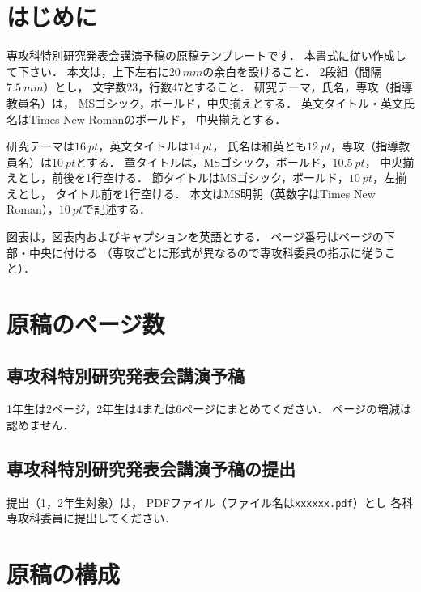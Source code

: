 \documentclass[nogutter]{ac-resume}
\begin{document}
\maketitle

\section{はじめに}

専攻科特別研究発表会講演予稿の原稿テンプレートです．
本書式に従い作成して下さい．
本文は，上下左右に$\SI{20}{mm}$の余白を設けること．
2段組（間隔$\SI{7.5}{mm}$）とし，
文字数23，行数47とすること．
研究テーマ，氏名，専攻（指導教員名）は，
MSゴシック，ボールド，中央揃えとする．
英文タイトル・英文氏名はTimes New Romanのボールド，
中央揃えとする．

研究テーマは$\SI{16}{pt}$，英文タイトルは$\SI{14}{pt}$，
氏名は和英とも$\SI{12}{pt}$，専攻（指導教員名）は$\SI{10}{pt}$とする．
章タイトルは，MSゴシック，ボールド，$\SI{10.5}{pt}$，
中央揃えとし，前後を1行空ける．
節タイトルはMSゴシック，ボールド，$\SI{10}{pt}$，左揃えとし，
タイトル前を1行空ける．
本文はMS明朝（英数字はTimes New Roman），$\SI{10}{pt}$で記述する．

図表は，図表内およびキャプションを英語とする．
ページ番号はページの下部・中央に付ける
（専攻ごとに形式が異なるので専攻科委員の指示に従うこと）．

\section{原稿のページ数}

\subsection{専攻科特別研究発表会講演予稿}

1年生は2ページ，2年生は4または6ページにまとめてください．
ページの増減は認めません．

\subsection{専攻科特別研究発表会講演予稿の提出}

提出（1，2年生対象）は，
PDFファイル（ファイル名は\texttt{xxxxxx.pdf}）とし
各科専攻科委員に提出してください．

\section{原稿の構成}
\end{document}
